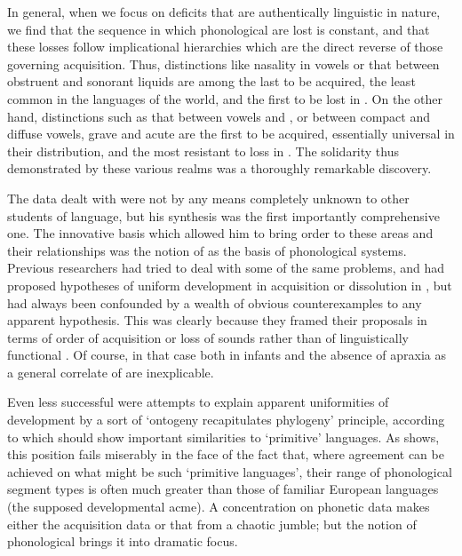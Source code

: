 In general, when we focus on deficits that are authentically
linguistic in nature, we find that the sequence in which phonological
 are lost is constant, and that these losses follow
implicational hierarchies which are the direct reverse of those
governing acquisition. Thus, distinctions like nasality in vowels or
that between obstruent and sonorant liquids are among the last to be
acquired, the least common in the languages of the world, and the
first to be lost in . On the other hand, distinctions such as
that between vowels and , or between compact and diffuse
vowels, grave and acute  are the first to be acquired,
essentially universal in their distribution, and the most resistant to
loss in . The solidarity thus demonstrated by these various
realms was a thoroughly remarkable discovery.

The data {\Jakobson} dealt with were not by any means completely unknown
to other students of language, but his synthesis was the first
importantly comprehensive one. The innovative basis which allowed him
to bring order to these areas and their relationships was the notion
of  as the basis of phonological systems. Previous researchers
had tried to deal with some of the same problems, and had proposed
hypotheses of uniform development in acquisition or dissolution in
, but had always been confounded by a wealth of obvious
counterexamples to any apparent hypothesis. This was clearly because
they framed their proposals in terms of order of acquisition or loss
of sounds rather than of linguistically functional . Of
course, in that case both  in infants and the absence of
apraxia as a general correlate of  are inexplicable.

Even less successful were attempts to explain apparent uniformities of
development by a sort of `ontogeny recapitulates phylogeny' principle,
according to which  should show important similarities
to `primitive' languages. As {\Jakobson} shows, this position fails
miserably in the face of the fact that, where agreement can be
achieved on what might be such `primitive languages', their range of
phonological segment types is often much greater than those of
familiar European languages (the supposed developmental acme). A
concentration on phonetic data makes either the acquisition data or
that from  a chaotic jumble; but the notion of phonological
 brings it into dramatic focus.

